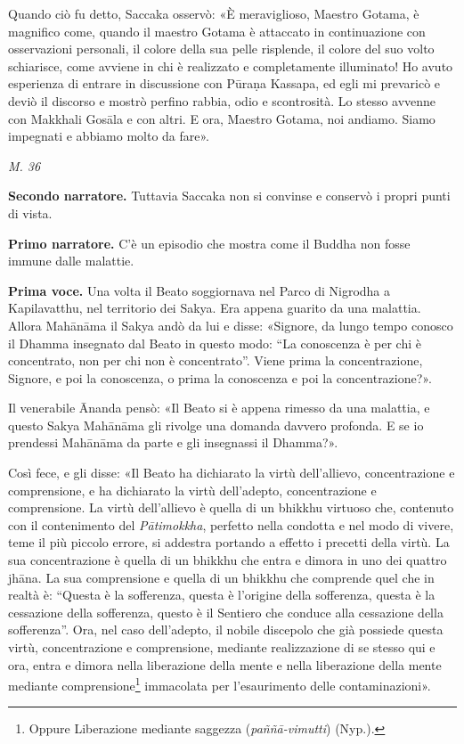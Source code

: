 Quando ciò fu detto, Saccaka osservò: «È meraviglioso, Maestro Gotama, è
magnifico come, quando il maestro Gotama è attaccato in continuazione
con osservazioni personali, il colore della sua pelle risplende, il
colore del suo volto schiarisce, come avviene in chi è realizzato e
completamente illuminato! Ho avuto esperienza di entrare in discussione
con Pūraṇa Kassapa, ed egli mi prevaricò e deviò il discorso e mostrò
perfino rabbia, odio e scontrosità. Lo stesso avvenne con Makkhali
Gosāla e con altri. E ora, Maestro Gotama, noi andiamo. Siamo impegnati
e abbiamo molto da fare».


\emph{M. 36}


\textbf{Secondo narratore.} Tuttavia Saccaka non si convinse e conservò i propri
punti di vista.


\textbf{Primo narratore.} C’è un episodio che mostra come il Buddha non fosse
immune dalle malattie.


\textbf{Prima voce.} Una volta il Beato soggiornava nel Parco di Nigrodha a
Kapilavatthu, nel territorio dei Sakya. Era appena guarito da una
malattia. Allora Mahānāma il Sakya andò da lui e disse: «Signore, da
lungo tempo conosco il Dhamma insegnato dal Beato in questo modo: “La
conoscenza è per chi è concentrato, non per chi non è concentrato”.
Viene prima la concentrazione, Signore, e poi la conoscenza, o prima la
conoscenza e poi la concentrazione?».


Il venerabile Ānanda pensò: «Il Beato si è appena rimesso da una
malattia, e questo Sakya Mahānāma gli rivolge una domanda davvero
profonda. E se io prendessi Mahānāma da parte e gli insegnassi il
Dhamma?».


Così fece, e gli disse: «Il Beato ha dichiarato la virtù dell’allievo,
concentrazione e comprensione, e ha dichiarato la virtù dell’adepto,
concentrazione e comprensione. La virtù dell’allievo è quella di un
bhikkhu virtuoso che, contenuto con il contenimento del \emph{Pātimokkha},
perfetto nella condotta e nel modo di vivere, teme il più piccolo
errore, si addestra portando a effetto i precetti della virtù. La sua
concentrazione è quella di un bhikkhu che entra e dimora in uno dei
quattro jhāna. La sua comprensione e quella di un bhikkhu che comprende
quel che in realtà è: “Questa è la sofferenza, questa è l’origine della
sofferenza, questa è la cessazione della sofferenza, questo è il
Sentiero che conduce alla cessazione della sofferenza”. Ora, nel caso
dell’adepto, il nobile discepolo che già possiede questa virtù,
concentrazione e comprensione, mediante realizzazione di se stesso qui e
ora, entra e dimora nella liberazione della mente e nella liberazione
della mente mediante comprensione\footnote{Oppure Liberazione mediante saggezza (\emph{paññā-vimutti}) (Nyp.).} immacolata per
l’esaurimento delle contaminazioni».


